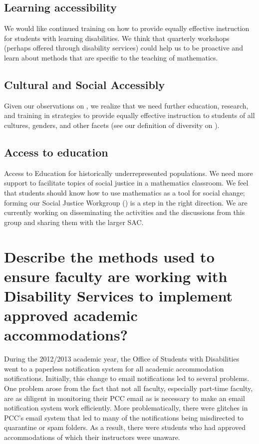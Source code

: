 \subsection{Learning accessibility}
We would like continued training on how to provide equally effective
instruction for students with learning disabilities. We think that quarterly
workshops (perhaps offered through disability services) could help us to be
proactive and learn about methods that are specific to the teaching of
mathematics.

\subsection{Cultural and Social Accessibly}
Given our observations on , we realize that we need
further education, research, and training in strategies to provide equally
effective instruction to students of all cultures, genders, and other facets
(see our definition of diversity on ).

\subsection{Access to education}
Access to Education for historically underrepresented populations. We need more
support to facilitate topics of social justice in a mathematics classroom. We
feel that students should know how to use mathematics as a tool for social
change; forming our Social Justice Workgroup () is 
a step in the right direction. We are currently working on disseminating the activities and the discussions from this
group and sharing them with the larger SAC.

\section{Describe the methods used to ensure faculty are working with Disability Services to implement approved academic accommodations?}
During the 2012/2013 academic year, the Office of Students with Disabilities
went to a paperless notification system for all academic accommodation
notifications.  Initially, this change to email notifications led to several
problems.  One problem arose from the fact that not all faculty, especially
part-time faculty, are as diligent in monitoring their PCC email as is
necessary to make an email notification system work efficiently.  More
problematically, there were glitches in PCC's email system that led to many of the
notifications being misdirected to quarantine or spam folders.  As a result,
there were students who had approved accommodations of which their instructors
were unaware.

